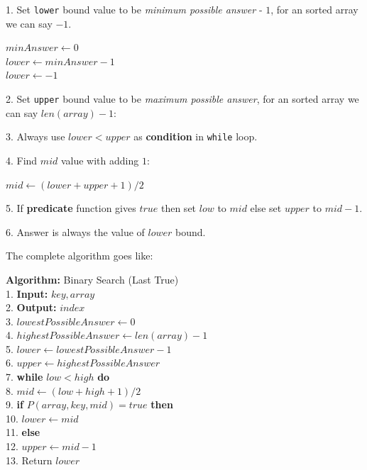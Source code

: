 \documentclass[10pt,twocolumn]{article}
\begin{document}
	\vspace{5pt}
	
	1. Set \texttt{lower} bound value to be \emph{minimum possible answer} - \(1\), for an sorted array we can say $-1$.
	
		\begin{center}
		
		\quad \(minAnswer \gets 0\) \\
		\quad \(lower \gets minAnswer - 1\) \\ 
		\quad \(lower \gets -1\) \\		
		
		
	\end{center}
	
	2. Set \texttt{upper} bound value to be \emph{maximum possible answer}, for an sorted array we can say $len(array) - 1$:
	
	3. Always use $lower < upper$ as \textbf{condition} in \texttt{while} loop.
	
	4. Find \(mid\) value with adding $1$:
	
	\begin{center}
		$mid \gets (lower + upper + 1) / 2$
	\end{center}
	
	
	5. If \textbf{predicate} function gives $true$ then set \(low\)  to \(mid\) else set \(upper\) to \(mid - 1\).
	
	6. Answer is always the value of \(lower\) bound.
	
	\vspace*{5pt}
	
	The complete algorithm goes like:
	
	\vspace*{10pt}
	
	\noindent
	\textbf{Algorithm:} Binary Search (Last True)\\
	1. \textbf{Input:} \(key, array\) \\
	2. \textbf{Output:} \(index\) \\
	3. \(lowestPossibleAnswer \gets 0\) \\
	4. \(highestPossibleAnswer \gets len(array) - 1\) \\
	5. \(lower \gets lowestPossibleAnswer - 1\) \\
	6. \(upper \gets highestPossibleAnswer\) \\
	7. \textbf{while} \(low < high\) \textbf{ do} \\
	8. \quad\(mid \gets (low + high + 1) / 2\) \\
	9. \quad \textbf{if} \(P(array, key, mid) = true \) \textbf{ then} \\
	10. \quad \quad \(lower \gets mid\) \\
	11. \quad \textbf{else} \\
	12. \quad \quad \(upper \gets mid - 1\) \\
	13. Return \(lower\)
	
\end{document}
